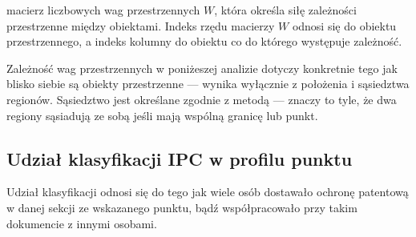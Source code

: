 { macierz liczbowych wag przestrzennych $W$,
  która określa siłę zależności przestrzenne między obiektami.
  Indeks rzędu macierzy $W$ odnosi się do obiektu przestrzennego,
  a indeks kolumny do obiektu co do którego występuje zależność.}

Zależność wag przestrzennych w poniżeszej analizie dotyczy 
konkretnie tego jak blisko siebie są obiekty przestrzenne ---
wynika wyłącznie z położenia i sąsiedztwa regionów.
Sąsiedztwo jest określane zgodnie z metodą 
--- znaczy to tyle, że dwa regiony sąsiadują ze sobą
jeśli mają wspólną granicę lub punkt.




  \subsection
{Udział klasyfikacji \ac{IPC} w profilu punktu}\label{udział-klasyfikacji}

Udział klasyfikacji odnosi się do tego jak wiele osób dostawało 
ochronę patentową w danej sekcji ze wskazanego punktu, 
bądź współpracowało przy takim dokumencie z innymi osobami.